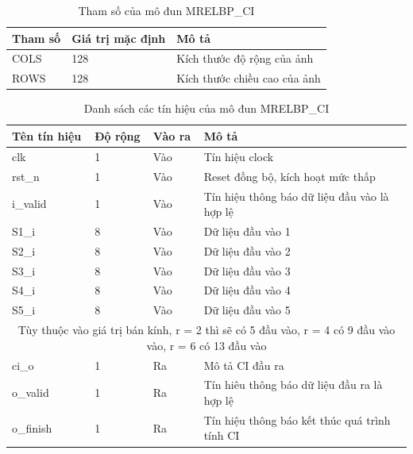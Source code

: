 \begin{table}[!ht]
    \centering
    \renewcommand{\arraystretch}{1.3} %
    \begin{tabular}{|p{3cm} p{4cm} p{8cm}|}
        \hline
        \rowcolor{gray!30}
        \textbf{Tham số } & \textbf{Giá trị mặc định}  & \textbf{Mô tả} \\
        \hline
        COLS & 128 & Kích thước độ rộng của ảnh
        \\ \hline
        ROWS & 128 & Kích thước chiều cao của ảnh
        \\
        \hline
    \end{tabular}
    \caption{Tham số của mô đun MRELBP\_CI}
    \label{tab:paramListCICAL}
\end{table}
\begin{table}[!ht]
    \centering
    \renewcommand{\arraystretch}{1.3} %
    \begin{tabular}{|p{3cm} p{2cm} p{2cm} p{8cm}|}
        \hline
        \rowcolor{gray!30}
        \textbf{Tên tín hiệu} & \textbf{Độ rộng} & \textbf{Vào ra} & \textbf{Mô tả} \\
        \hline
        clk & 1 & Vào & Tín hiệu clock \\
        \hline
        rst\_n & 1 & Vào & Reset đồng bộ, kích hoạt mức thấp \\
        \hline 
        i\_valid & 1 & Vào & Tín hiệu thông báo dữ liệu đầu vào là hợp lệ
        \\ \hline
        S1\_i & 8 & Vào & Dữ liệu đầu vào 1
        \\ \hline
        S2\_i & 8 & Vào & Dữ liệu đầu vào 2
        \\ \hline
                S3\_i & 8 & Vào & Dữ liệu đầu vào 3
        \\ \hline
                S4\_i & 8 & Vào & Dữ liệu đầu vào 4
        \\ \hline
                        S5\_i & 8 & Vào & Dữ liệu đầu vào 5
        \\ \hline
        \multicolumn{4}{|c|}{Tùy thuộc vào giá trị bán kính, r = 2 thì sẽ có 5 đầu vào, r = 4 có 9 đầu vào vào, r = 6 có 13 đầu vào}
        \\ \hline
        ci\_o & 1 & Ra & Mô tả CI đầu ra
        \\ \hline
        o\_valid & 1 & Ra & Tín hiêu thông báo dữ liệu đầu ra là hợp lệ
        \\ \hline
        o\_finish & 1 & Ra & Tín hiệu thông báo kết thúc quá trình tính CI
        \\ \hline
       
    \end{tabular}
    \caption{Danh sách các tín hiệu của mô đun MRELBP\_CI}
    \label{tab:signalListCICAL}
\end{table}
